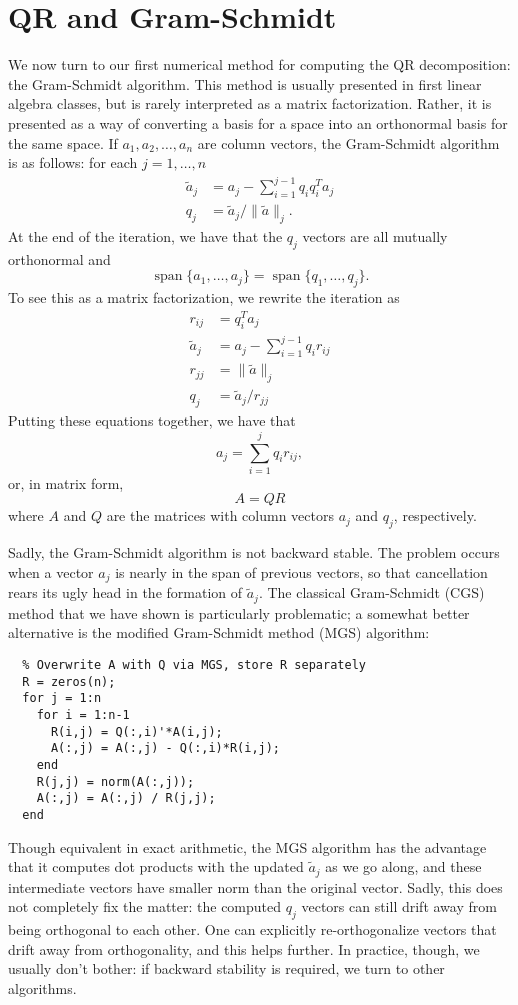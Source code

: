 \documentclass[12pt, leqno]{article} %
\begin{document}

\section{QR and Gram-Schmidt}

We now turn to our first numerical method for computing the
QR decomposition: the Gram-Schmidt algorithm.  This method is
usually presented in first linear algebra classes, but is
rarely interpreted as a matrix factorization.  Rather, it is
presented as a way of converting a basis for a space into an
orthonormal basis for the same space.  If $a_1, a_2, \ldots, a_n$
are column vectors, the Gram-Schmidt algorithm is as follows:
for each $j = 1, \ldots, n$
\begin{align*}
  \tilde{a}_j &= a_j - \sum_{i=1}^{j-1} q_i q_i^T a_j \\
  q_j &= \tilde{a}_j / \|\tilde{a}\|_j.
\end{align*}
At the end of the iteration, we have that the $q_j$ vectors are
all mutually orthonormal and
\[
  \operatorname{span}\{ a_1, \ldots, a_j \} =
  \operatorname{span}\{ q_1, \ldots, q_j \}.
\]
To see this as a matrix factorization, we rewrite the iteration as
\begin{align*}
  r_{ij} &= q_i^T a_j \\
  \tilde{a}_j &= a_j - \sum_{i=1}^{j-1} q_i r_{ij} \\
  r_{jj} &= \|\tilde{a}\|_j \\
  q_j &= \tilde{a}_j / r_{jj}
\end{align*}
Putting these equations together, we have that
\[
  a_j = \sum_{i=1}^j q_i r_{ij},
\]
or, in matrix form,
\[
  A = QR
\]
where $A$ and $Q$ are the matrices with column vectors $a_j$ and $q_j$,
respectively.

Sadly, the Gram-Schmidt algorithm is not backward stable.
The problem occurs when a vector $a_j$ is nearly in the span of
previous vectors, so that cancellation rears its ugly head in the
formation of $\tilde{a}_j$.  The
classical Gram-Schmidt (CGS) method that we have shown is particularly
problematic; a somewhat better alternative is the modified Gram-Schmidt
method (MGS) algorithm:
\begin{lstlisting}
  % Overwrite A with Q via MGS, store R separately
  R = zeros(n);
  for j = 1:n
    for i = 1:n-1
      R(i,j) = Q(:,i)'*A(i,j);
      A(:,j) = A(:,j) - Q(:,i)*R(i,j);
    end
    R(j,j) = norm(A(:,j));
    A(:,j) = A(:,j) / R(j,j);
  end
\end{lstlisting}
Though equivalent in exact arithmetic, the MGS algorithm has the advantage
that it computes dot products with the updated $\tilde{a}_j$ as we go
along, and these intermediate vectors have smaller norm than the original
vector.  Sadly, this does not completely fix the matter: the computed $q_j$
vectors can still drift away from being orthogonal to each other.  One can
explicitly re-orthogonalize vectors that drift away from orthogonality,
and this helps further.  In practice, though, we usually don't bother: if
backward stability is required, we turn to other algorithms.
\end{document}
